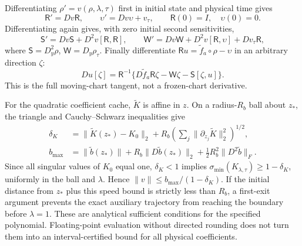 Differentiating $\rho'=v(\rho,\lambda,\tau)$ first in initial state and physical time gives
\begin{equation}
 \mathsf R'=Dv\mathsf R,\qquad
 \upsilon'=Dv\upsilon+v_\tau,\qquad
 \mathsf R(0)=I,\quad\upsilon(0)=0.
 \label{eq:sup-first-sensitivity}
\end{equation}
Differentiating again gives, with zero initial second sensitivities,
\begin{equation}
 \mathsf S'=Dv\mathsf S+D^2v[\mathsf R,\mathsf R],\qquad
 \mathsf W'=Dv\mathsf W+D^2v[\mathsf R,\upsilon]+Dv_\tau\mathsf R,
 \label{eq:sup-second-sensitivity}
\end{equation}
where $\mathsf S=D_y^2\rho$, $\mathsf W=D_y\rho_\tau$. Finally differentiate $\mathsf R u=\widetilde f_a\circ\rho-\upsilon$ in an arbitrary direction $\zeta$:
\begin{equation}
 Du[\zeta]=\mathsf R^{-1}
 \{D\widetilde f_a\mathsf R\zeta-\mathsf W\zeta-\mathsf S[\zeta,u]\}.
 \label{eq:sup-chart-tangent}
\end{equation}
This is the full moving-chart tangent, not a frozen-chart derivative.

For the quadratic coefficient cache, $\widetilde K$ is affine in $z$. On a radius-$R_b$ ball about $z_*$, the triangle and Cauchy--Schwarz inequalities give
\begin{align}
 \delta_K&=\|\widetilde K(z_*)-K_0\|_2
       +R_b\left(\sum_j\|\partial_{z_j}\widetilde K\|_2^2\right)^{1/2},\\
 b_{\max}&=\|\widetilde b(z_*)\|+R_b\|D\widetilde b(z_*)\|_2
                          +\tfrac12R_b^2\|D^2\widetilde b\|_F.
 \label{eq:sup-ball-bounds}
\end{align}
Since all singular values of $K_0$ equal one, $\delta_K<1$ implies $\sigma_{\min}(K_{\lambda,\tau})\ge1-\delta_K$, uniformly in the ball and $\lambda$. Hence $\|v\|\le b_{\max}/(1-\delta_K)$. If the initial distance from $z_*$ plus this speed bound is strictly less than $R_b$, a first-exit argument prevents the exact auxiliary trajectory from reaching the boundary before $\lambda=1$. These are analytical sufficient conditions for the specified polynomial. Floating-point evaluation without directed rounding does not turn them into an interval-certified bound for all physical coefficients.


